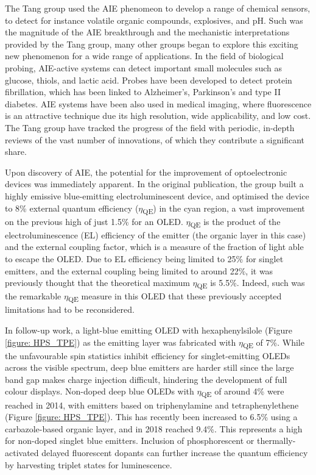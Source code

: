 The Tang group used the AIE phenomeon to develop a range of chemical sensors, to detect for instance volatile organic compounds, explosives, and pH.\cite{Dong2007,Li2005,Li2009} Such was the magnitude of the AIE breakthrough and the mechanistic interpretations provided by the Tang group, many other groups began to explore this exciting new phenomenon for a wide range of applications. In the field of biological probing, AIE-active systems can detect important small molecules such as glucose, thiols, and lactic acid.\cite{Wang2014,Yuan2014,Shen2012} Probes have been developed to detect protein fibrillation, which has been linked to Alzheimer's, Parkinson's and type II diabetes.\cite{Hong2012} AIE systems have been also used in medical imaging, where fluorescence is an attractive technique due its high resolution, wide applicability, and low cost.\cite{Mei2015} The Tang group have tracked the progress of the field with periodic, in-depth reviews of the vast number of innovations, of which they contribute a significant share.\cite{Hong2009,Wang2010a,Hong2011,Mei2014,Hu2014,Mei2015}

Upon discovery of AIE, the potential for the improvement of optoelectronic devices was immediately apparent. In the original publication, the group built a highly emissive blue-emitting electroluminescent device, and optimised the device to 8\% external quantum efficiency ($\eta$\textsubscript{QE}) in the cyan region, a vast improvement on the previous high of just 1.5\% for an OLED. \cite{Luo2001,Chen2002} $\eta$\textsubscript{QE} is the product of the electroluminescence (EL) efficiency of the emitter (the organic layer in this case) and the external coupling factor, which is a measure of the fraction of light able to escape the OLED. Due to EL efficiency being limited to 25\% for singlet emitters, and the external coupling being limited to around 22\%, it was previously thought that the theoretical maximum $\eta$\textsubscript{QE} is 5.5\%. Indeed, such was the remarkable $\eta$\textsubscript{QE} measure in this OLED that these previously accepted limitations had to be reconsidered.

In follow-up work, a light-blue emitting OLED with hexaphenylsilole (Figure \ref{figure: HPS_TPE}) as the emitting layer was fabricated with $\eta$\textsubscript{QE} of 7\%.\cite{Chen2003} While the unfavourable spin statistics inhibit efficiency for singlet-emitting OLEDs across the visible spectrum, deep blue emitters are harder still since the large band gap makes charge injection difficult, hindering the development of full colour displays. Non-doped deep blue OLEDs with $\eta$\textsubscript{QE} of around 4\% were reached in 2014, with emitters based on triphenylamine and tetraphenylethene (Figure \ref{figure: HPS_TPE}).\cite{Huang2014,Huang2014a} This has recently been increased to 6.5\% using a carbazole-based organic layer, and in 2018 reached 9.4\%.\cite{KumarKonidena2017,Tang2018} This represents a high for non-doped singlet blue emitters. Inclusion of phosphorescent or thermally-activated delayed fluorescent dopants can further increase the quantum efficiency by harvesting triplet states for luminescence.\cite{Zhu2018}

